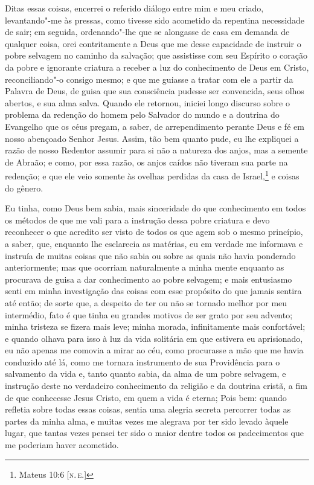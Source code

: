 Ditas essas coisas, encerrei o referido diálogo entre mim e meu criado,
levantando"-me às pressas, como tivesse sido acometido da repentina
necessidade de sair; em seguida, ordenando"-lhe que se alongasse de casa
em demanda de qualquer coisa, orei contritamente a Deus que me desse
capacidade de instruir o pobre selvagem no caminho da salvação; que
assistisse com seu Espírito o coração da pobre e ignorante criatura a
receber a luz do conhecimento de Deus em Cristo, reconciliando"-o consigo
mesmo; e que me guiasse a tratar com ele a partir da Palavra de Deus, de
guisa que sua consciência pudesse ser convencida, seus olhos abertos, e
sua alma salva. Quando ele retornou, iniciei longo discurso sobre o
problema da redenção do homem pelo Salvador do mundo e a doutrina do
Evangelho que os céus pregam, a saber, de arrependimento perante Deus e
fé em nosso abençoado Senhor Jesus. Assim, tão bem quanto pude, eu lhe
expliquei a razão de nosso Redentor assumir para si não a natureza dos
anjos, mas a semente de Abraão; e como, por essa razão, os anjos caídos
não tiveram sua parte na redenção; e que ele veio somente às ovelhas
perdidas da casa de Israel,\footnote{Mateus 10:6 {[}\textsc{n.\,e.}{]}} e coisas
do gênero.

Eu tinha, como Deus bem sabia, mais sinceridade do que conhecimento em
todos os métodos de que me vali para a instrução dessa pobre criatura e
devo reconhecer o que acredito ser visto de todos os que agem sob o
mesmo princípio, a saber, que, enquanto lhe esclarecia as matérias, eu
em verdade me informava e instruía de muitas coisas que não sabia ou
sobre as quais não havia ponderado anteriormente; mas que ocorriam
naturalmente a minha mente enquanto as procurava de guisa a dar
conhecimento ao pobre selvagem; e mais entusiasmo senti em minha
investigação das coisas com esse propósito do que jamais sentira até
então; de sorte que, a despeito de ter ou não se tornado melhor por meu
intermédio, fato é que tinha eu grandes motivos de ser grato por seu
advento; minha tristeza se fizera mais leve; minha morada, infinitamente
mais confortável; e quando olhava para isso à luz da vida solitária em
que estivera eu aprisionado, eu não apenas me comovia a mirar ao céu,
como procurasse a mão que me havia conduzido até lá, como me tornara
instrumento de sua Providência para o salvamento da vida e, tanto quanto
sabia, da alma de um pobre selvagem, e instrução deste no verdadeiro
conhecimento da religião e da doutrina cristã, a fim de que conhecesse
Jesus Cristo, em quem a vida é eterna; Pois bem: quando refletia sobre
todas essas coisas, sentia uma alegria secreta percorrer todas as partes
da minha alma, e muitas vezes me alegrava por ter sido levado àquele
lugar, que tantas vezes pensei ter sido o maior dentre todos os
padecimentos que me poderiam haver acometido.

